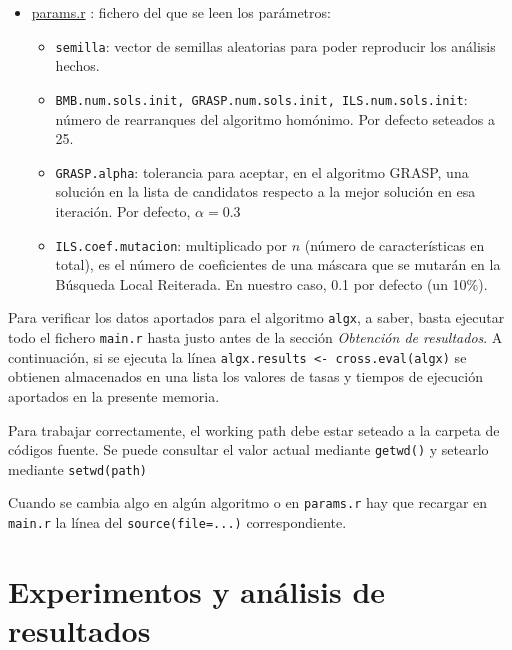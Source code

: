 \documentclass[a4paper,11pt]{article}
\newcommand{\hrefr}[1]{
\href{../bin/#1}{#1}
}
\begin{document}
\begin{itemize}
 \item \hrefr{params.r}: fichero del que se leen los parámetros:
  \begin{itemize}
    \item \texttt{semilla}: vector de semillas aleatorias para poder reproducir los análisis hechos.
    \item \texttt{BMB.num.sols.init, GRASP.num.sols.init, ILS.num.sols.init}: número de rearranques del algoritmo homónimo.
    Por defecto seteados a 25.
    \item \texttt{GRASP.alpha}: tolerancia para aceptar, en el algoritmo GRASP, una solución en la lista de candidatos 
    respecto a la mejor solución en esa iteración. Por defecto, $\alpha=0.3$
    \item \texttt{ILS.coef.mutacion}: multiplicado por $n$ (número de características en total), es el número de coeficientes
    de una máscara que se mutarán en la Búsqueda Local Reiterada. En nuestro caso, 0.1 por defecto (un 10\%).
  \end{itemize}
 \end{itemize}
 
 Para verificar los datos aportados para el algoritmo \texttt{algx}, a saber, basta ejecutar todo el fichero \texttt{main.r}
 hasta justo antes de la sección \textit{Obtención de resultados}. A continuación, si se ejecuta la línea 
 \texttt{algx.results <- cross.eval(algx)} se obtienen almacenados en una lista los valores de tasas y tiempos de ejecución
 aportados en la presente memoria. 
 
 Para trabajar correctamente, el working path debe estar seteado a la carpeta de códigos fuente. Se puede consultar el 
 valor actual mediante \texttt{getwd()} y setearlo mediante \texttt{setwd(path)}
 
 Cuando se cambia algo en algún algoritmo o en \texttt{params.r} hay que recargar en \texttt{main.r}
 la línea del \texttt{source(file=...)} correspondiente.
 
 \section{Experimentos y análisis de resultados}
\end{document}
